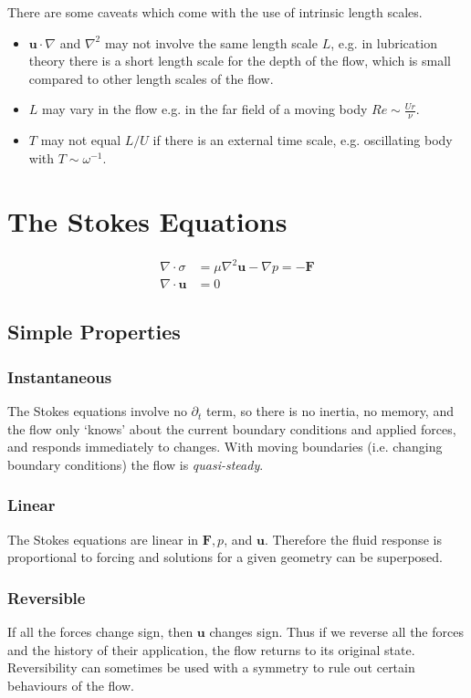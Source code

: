 \documentclass{jknotes}
\begin{document}
There are some caveats which come with the use of intrinsic length scales.
\begin{itemize}
	\item $\symbf{u} \cdot \nabla$ and $\nabla^2$ may not involve the same length
		scale $L$, e.g. in lubrication theory there is a short length scale
		for the depth of the flow, which is small compared to other length
		scales of the flow.
	\item $L$ may vary in the flow e.g. in the far field of a moving body $Re
		\sim \frac{Ur}{\nu}$.
	\item $T$ may not equal $L/U$ if there is an external time scale, e.g.
		oscillating body with $T \sim \omega^{-1}$.
\end{itemize}

\section{The Stokes Equations}
\begin{equation}
	\begin{aligned}
		\nabla \cdot \sigma &= \mu \nabla^2 \symbf{u} - \nabla p = - \symbf{F} \\
		\nabla \cdot \symbf{u} &= 0
	\end{aligned}
\end{equation}

\subsection{Simple Properties}
\subsubsection{Instantaneous}
The Stokes equations involve no $\partial_t$ term, so there is no inertia, no
memory, and the flow only `knows' about the current boundary conditions and
applied forces, and responds immediately to changes. With moving boundaries
(i.e. changing boundary conditions) the flow is \emph{quasi-steady}.

\subsubsection{Linear}
The Stokes equations are linear in $\symbf{F}, p$, and $\symbf{u}$. Therefore the
fluid response is proportional to forcing and solutions for a given geometry
can be superposed.

\subsubsection{Reversible}
If all the forces change sign, then $\symbf{u}$ changes sign. Thus if we reverse
all the forces and the history of their application, the flow returns to its
original state. Reversibility can sometimes be used with a symmetry to rule
out certain behaviours of the flow.
\end{document}

